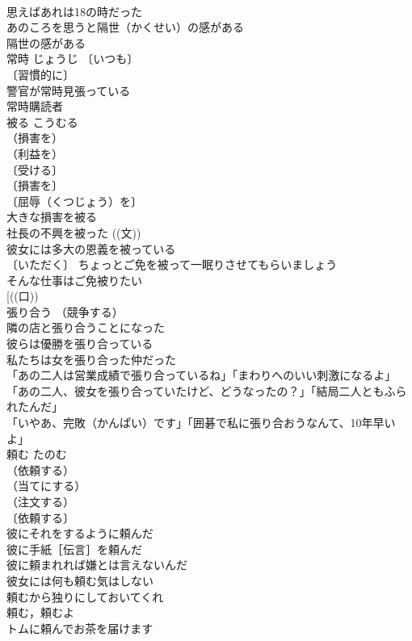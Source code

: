 \documentclass[8pt]{extreport}
\begin{document}
\begin{CJK}{UTF8}{min}
\\	思えばあれは18の時だった 
\\	あのころを思うと隔世（かくせい）の感がある 
\\	隔世の感がある　
\\	常時	じょうじ	〔いつも〕
\\	〔習慣的に〕
\\	警官が常時見張っている 
\\	常時購読者 
\\	被る	こうむる	
\\	（損害を）
\\	（利益を）
\\	〔受ける〕
\\	〔損害を〕
\\	〔屈辱（くつじょう）を〕
\\	大きな損害を被る 
\\	社長の不興を被った ((文)) 
\\	彼女には多大の恩義を被っている 
\\	〔いただく〕 ちょっとご免を被って一眠りさせてもらいましょう 
\\	そんな仕事はご免被りたい 
\\	[((口)) 
\\	張り合う	（競争する）
\\	隣の店と張り合うことになった 
\\	彼らは優勝を張り合っている 
\\	私たちは女を張り合った仲だった 
\\	「あの二人は営業成績で張り合っているね」「まわりへのいい刺激になるよ」 
\\	「あの二人、彼女を張り合っていたけど、どうなったの？」「結局二人ともふられたんだ」 
\\	「いやあ、完敗（かんぱい）です」「囲碁で私に張り合おうなんて、10年早いよ」 
\\	頼む	たのむ	
\\	（依頼する）
\\	（当てにする）
\\	（注文する）
\\	〔依頼する〕
\\	彼にそれをするように頼んだ 
\\	彼に手紙［伝言］を頼んだ 
\\	彼に頼まれれば嫌とは言えないんだ 
\\	彼女には何も頼む気はしない 
\\	頼むから独りにしておいてくれ 
\\	頼む，頼むよ 
\\	トムに頼んでお茶を届けます 

\end{CJK}
\end{document}
